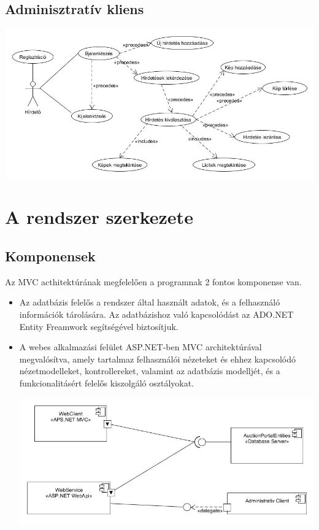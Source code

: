 \documentclass[12pt,a4paper]{article}
\begin{document}
\subsection{Adminisztratív kliens}
\includegraphics[scale=0.5]{felhasznalo_diag2.jpg}


\section{A rendszer szerkezete}
\subsection{Komponensek}
Az MVC acthitektúrának megfelelően a programnak 2 fontos komponense van.
\begin{itemize}
\item Az adatbázis felelős a rendszer által használt adatok, és a felhasználó információk tárolására. Az adatbázishoz való kapcsolódást az ADO.NET Entity Freamwork segítségével biztosítjuk.
\item A webes alkalmazási felület ASP.NET-ben MVC architektúrával megvalósítva, amely tartalmaz felhasználói nézeteket és ehhez kapcsolódó nézetmodelleket, kontrollereket, valamint az adatbázis modelljét, és a funkcionalitásért felelős kiszolgáló osztályokat.

\includegraphics[scale=0.5]{komponens_diagram.jpg}

\end{itemize}
\end{document}
